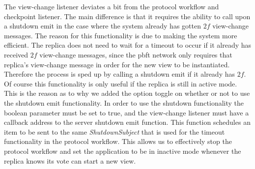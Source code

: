 The view-change listener deviates a bit from the protocol workflow and checkpoint listener. The main difference is that it requires the ability to call upon a shutdown emit in the case where the system already has gotten $2f$ view-change messages. The reason for this functionality is due to making the system more efficient. The replica does not need to wait for a timeout to occur if it already has received $2f$ view-change messages, since the \ac{pbft} network only requires that replica's view-change message in order for the new view to be instantiated. Therefore the process is sped up by calling a shutdown emit if it already has $2f$. Of course this functionality is only useful if the replica is still in active mode. This is the reason as to why we added the option toggle on whether or not to use the shutdown emit functionality. In order to use the shutdown functionality the boolean parameter  must be set to true, and the view-change listener must have a callback address to the server shutdown emit function. This function schedules an item to be sent to the same  \emph{ShutdownSubject} that is used for the timeout functionality in the protocol workflow. This allows us to effectively stop the protocol workflow and set the application to be in inactive mode whenever the replica knows its vote can start a new view. 

